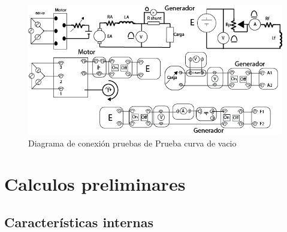 \documentclass[11pt,letterpaper]{article}     %
\begin{document}
\begin{figure}[H]
    \centering
    \includegraphics[scale=0.5]{./recursos-Lab6/diagGeneradorIndependiente.png}
    \caption{Diagrama de conexión pruebas de Prueba curva de vacio}
    \label{fig:diagGeneradorIndependiente}
\end{figure}
\section{Calculos preliminares}
\subsection{Características internas}
\end{document}
